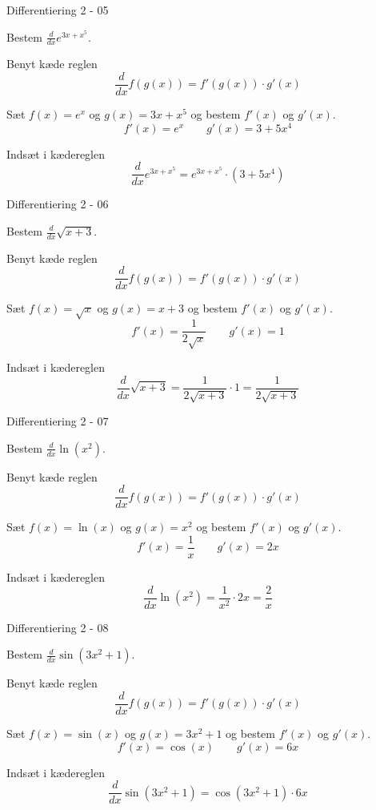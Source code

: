 \documentclass{article}
\begin{document}
\begin{exercise}{Differentiering 2 - 05}
	
	Bestem $\frac{d}{dx} e^{3x + x^5}$.
	
	
	\hint
	Benyt kæde reglen
	\[
	\frac{d}{dx} f(g(x)) = f'(g(x)) \cdot g'(x)
	\]
	
	\hint
	Sæt $f(x) = e^x$ og $g(x) = 3x + x^5$ og bestem $f'(x)$ og $g'(x)$.
	\[
	f'(x) = e^x \qquad g'(x) = 3 + 5 x^4
	\]
	
	\hint
	Indsæt i kædereglen
	\[
	\frac{d}{dx} e^{3x + x^5} = e^{3x + x^5} \cdot (3 + 5x^4)
	\]
	
\end{exercise}

\begin{exercise}{Differentiering 2 - 06}
	
	Bestem $\frac{d}{dx} \sqrt{x+3}$.
	
	
	\hint
	Benyt kæde reglen
	\[
	\frac{d}{dx} f(g(x)) = f'(g(x)) \cdot g'(x)
	\]
	
	\hint
	Sæt $f(x) = \sqrt{x}$ og $g(x) = x+3$ og bestem $f'(x)$ og $g'(x)$.
	\[
	f'(x) =\frac{1}{2 \sqrt{x}} \qquad g'(x) = 1 
	\]
	
	\hint
	Indsæt i kædereglen
	\[
	\frac{d}{dx} \sqrt{x+3} = \frac{1}{2 \sqrt{x + 3}} \cdot 1  = \frac{1}{2 \sqrt{x + 3 }}
	\]
	
\end{exercise}

\begin{exercise}{Differentiering 2 - 07}
	
	Bestem $\frac{d}{dx} \ln(x^2)$.
	
	
	\hint
	Benyt kæde reglen
	\[
	\frac{d}{dx} f(g(x)) = f'(g(x)) \cdot g'(x)
	\]
	
	\hint
	Sæt $f(x) = \ln(x)$ og $g(x) = x^2$ og bestem $f'(x)$ og $g'(x)$.
	\[
	f'(x) = \frac{1}{x} \qquad g'(x) = 2x
	\]
	
	\hint
	Indsæt i kædereglen
	\[
	\frac{d}{dx} \ln(x^2) = \frac{1}{x^2} \cdot 2x = \frac{2}{x} 	
	\]
	
\end{exercise}

\begin{exercise}{Differentiering 2 - 08}
	
	Bestem $\frac{d}{dx} \sin(3x^2+1)$.
	
	
	\hint
	Benyt kæde reglen
	\[
	\frac{d}{dx} f(g(x)) = f'(g(x)) \cdot g'(x)
	\]
	
	\hint
	Sæt $f(x) = \sin(x)$ og $g(x) = 3x^2 + 1$ og bestem $f'(x)$ og $g'(x)$.
	\[
	f'(x) = \cos(x) \qquad g'(x) = 6x
	\]
	
	\hint
	Indsæt i kædereglen
	\[
	\frac{d}{dx} \sin(3x^2 + 1)  = \cos(3x^2 + 1) \cdot 6x 
	\]
	
\end{exercise}
\end{document}
